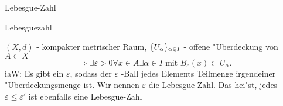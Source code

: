 \documentclass[class=article, crop=false]{standalone}
\begin{document}
\begin{zettel}{Lebesgue-Zahl}
\begin{flashcard}[alvua8y3]{Lebesguezahl}
	\begin{definition}
		$(X,d)$ - kompakter metrischer Raum,
		$\set{ U_{\alpha}  }_{\alpha \in  I}$ - offene "Uberdeckung von $A \subset X$
		\[
			\implies \exists \varepsilon > 0 \forall x \in  A \exists \alpha \in  I \text{ mit } B_{\varepsilon }(x) \subset U_{\alpha }
		.\]
		iaW: Es gibt ein $\varepsilon$, sodass der $\varepsilon$ -Ball  jedes Elements Teilmenge irgendeiner "Uberdeckungsmenge ist. Wir nennen $\varepsilon $ die Lebesgue Zahl. Das hei"st, jedes $\varepsilon \leq \varepsilon'$ ist ebenfalls eine Lebesgue-Zahl
	\end{definition}
\end{flashcard}
\end{zettel}
\end{document}
